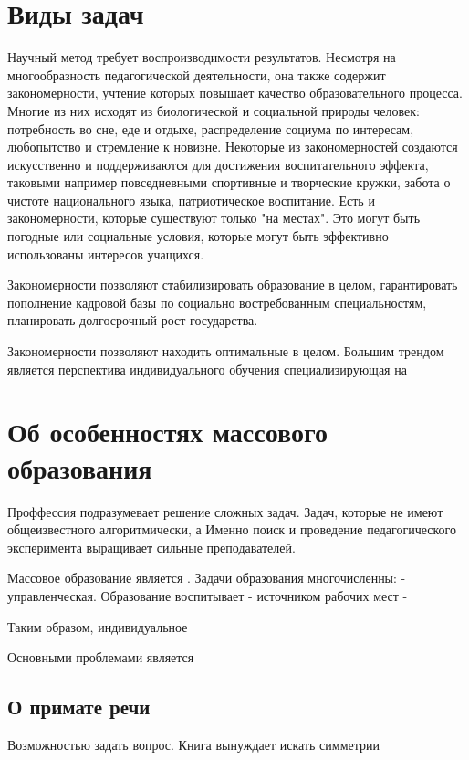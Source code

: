 \section{Виды задач}

Научный метод требует воспроизводимости результатов. Несмотря на многообразность педагогической деятельности, 
она также содержит закономерности, учтение которых повышает качество образовательного процесса. Многие из них исходят из биологической и социальной природы человек: потребность во сне, еде и отдыхе, распределение социума по интересам, любопытство и стремление к новизне. Некоторые из закономерностей создаются искусственно и поддерживаются для достижения воспитательного эффекта, таковыми например повседневными спортивные и творческие кружки, забота о чистоте национального языка, патриотическое воспитание. Есть и закономерности, которые существуют только "на местах". Это могут быть погодные или социальные условия, которые могут быть эффективно использованы интересов учащихся.

Закономерности позволяют стабилизировать образование в целом, гарантировать пополнение кадровой базы по социально востребованным специальностям, планировать долгосрочный рост государства.

Закономерности позволяют находить оптимальные в целом. Большим трендом является перспектива индивидуального обучения специализирующая на 


\section{Об особенностях массового образования}

Проффессия подразумевает решение сложных задач. Задач, которые не имеют общеизвестного алгоритмически, а
Именно поиск и проведение педагогического эксперимента выращивает сильные преподавателей.


Массовое образование является . Задачи образования многочисленны:
- управленческая. Образование воспитывает
- источником рабочих мест 
-

Таким образом, индивидуальное 

Основными проблемами является

\subsection{О примате речи}

Возможностью задать вопрос. Книга вынуждает искать симметрии 



